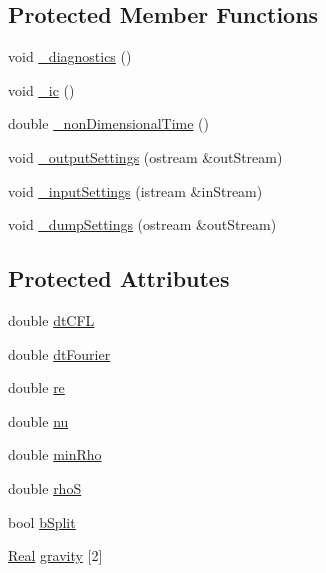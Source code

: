 \subsection*{Protected Member Functions}
\begin{DoxyCompactItemize}
\item 
void \hyperlink{class_sim___multiphase_a1d7da812e0fa53739218cdddf32343ff}{\+\_\+diagnostics} ()
\item 
void \hyperlink{class_sim___multiphase_a430045c05f7a38cca2d0f592f860da9a}{\+\_\+ic} ()
\item 
double \hyperlink{class_sim___multiphase_a6b730baf4ffad9fba3b830058b3f1fe2}{\+\_\+non\+Dimensional\+Time} ()
\item 
void \hyperlink{class_sim___multiphase_ade0448d208af354ba122e626e0fa8bbf}{\+\_\+output\+Settings} (ostream \&out\+Stream)
\item 
void \hyperlink{class_sim___multiphase_a870573f19f925731154e4695a4c32cb2}{\+\_\+input\+Settings} (istream \&in\+Stream)
\item 
void \hyperlink{class_sim___multiphase_a479bea55b13a717af30a1657b92899a5}{\+\_\+dump\+Settings} (ostream \&out\+Stream)
\end{DoxyCompactItemize}
\subsection*{Protected Attributes}
\begin{DoxyCompactItemize}
\item 
double \hyperlink{class_sim___multiphase_ac6f721aa2c2702404115f333ece6fa99}{dt\+C\+F\+L}
\item 
double \hyperlink{class_sim___multiphase_aa7c5d2c194c70c5c86a36982f8ae99c5}{dt\+Fourier}
\item 
double \hyperlink{class_sim___multiphase_ab75819bd31153d20f56ae0ccfdb6145f}{re}
\item 
double \hyperlink{class_sim___multiphase_abd7f38e007c07621884d757b19d70b8f}{nu}
\item 
double \hyperlink{class_sim___multiphase_a3699db731e1856ecd2fabf57145791ab}{min\+Rho}
\item 
double \hyperlink{class_sim___multiphase_a898c62fc2266a25d9bc02d238b313989}{rho\+S}
\item 
bool \hyperlink{class_sim___multiphase_a07417107eed36985b3dac706429105b7}{b\+Split}
\item 
\hyperlink{_h_d_f5_dumper_8h_a445a5f0e2a34c9d97d69a3c2d1957907}{Real} \hyperlink{class_sim___multiphase_a4651ed9ca83e513c78949f6750b08a4a}{gravity} \mbox{[}2\mbox{]}
\end{DoxyCompactItemize}


